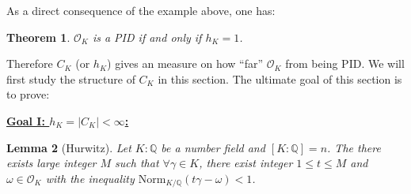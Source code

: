 \documentclass[11pt]{book}
\newtheorem{theorem}{Theorem}[section]
\newtheorem{lemma}[theorem]{Lemma}
\begin{document}
As a direct consequence of the example above, one has:
\begin{theorem}
    $\mathcal{O}_{K}$ is a PID if and only if $h_{K}=1$. 
\end{theorem}

Therefore $C_{K}$ (or $h_K$) gives an measure on how ``far'' $\mathcal{O}_{K}$ from being PID. We will first study the structure of $C_{K}$ in this section. The ultimate goal of this section is to prove: 
\begin{center}
\end{center}
    
\noindent \underline{\bf Goal I: $h_{K}= |C_K| <\infty$:} 

\begin{lemma}[Hurwitz]\label{lem-Hurwitz}
    Let $K:\mathbb{Q}$ be a number field and $[K:\mathbb{Q}]=n$. The there exists large integer $M$ such that $\forall \gamma\in K$, there exist integer $1\leq t\leq M$ and $\omega \in \mathcal{O}_{K}$ with the inequality $\mathrm{Norm}_{K /\mathbb{Q}}(t\gamma-\omega)<1$. 
\end{lemma}
\end{document}
